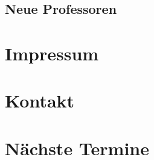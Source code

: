 \documentclass[12pt, a4paper]{article}
\begin{document}
\subsection{Neue Professoren}

\newpage
\section{Impressum}


\section{Kontakt}

\section{Nächste Termine}

\end{document}
